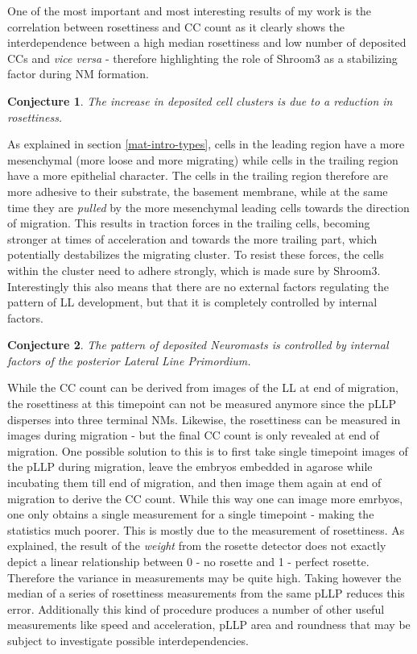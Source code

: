 \documentclass[11pt,singlespacinge,twoside]{reedthesis} %
\newtheorem{conjecture}{Conjecture}[chapter]
\theoremstyle{definition}
\theoremstyle{definition}
\theoremstyle{definition}
\theoremstyle{remark}
\begin{document}
One of the most important and most interesting results of my work is the correlation between rosettiness and CC count as it clearly shows the interdependence between a high median rosettiness and low number of deposited CCs and \emph{vice versa} - therefore highlighting the role of Shroom3 as a stabilizing factor during NM formation.
\begin{conjecture}
\protect\hypertarget{cnj:unnamed-chunk-13}{}{\label{cnj:unnamed-chunk-13} }The increase in deposited cell clusters is due to a reduction in rosettiness.
\end{conjecture}
As explained in section \ref{mat-intro-types}, cells in the leading region have a more mesenchymal (more loose and more migrating) while cells in the trailing region have a more epithelial character. The cells in the trailing region therefore are more adhesive to their substrate, the basement membrane, while at the same time they are \emph{pulled} by the more mesenchymal leading cells towards the direction of migration. This results in traction forces in the trailing cells, becoming stronger at times of acceleration and towards the more trailing part, which potentially destabilizes the migrating cluster. To resist these forces, the cells within the cluster need to adhere strongly, which is made sure by Shroom3. Interestingly this also means that there are no external factors regulating the pattern of LL development, but that it is completely controlled by internal factors.
\begin{conjecture}
\protect\hypertarget{cnj:unnamed-chunk-14}{}{\label{cnj:unnamed-chunk-14} }The pattern of deposited Neuromasts is controlled by internal factors of the posterior Lateral Line Primordium.
\end{conjecture}
While the CC count can be derived from images of the LL at end of migration, the rosettiness at this timepoint can not be measured anymore since the pLLP disperses into three terminal NMs. Likewise, the rosettiness can be measured in images during migration - but the final CC count is only revealed at end of migration. One possible solution to this is to first take single timepoint images of the pLLP during migration, leave the embryos embedded in agarose while incubating them till end of migration, and then image them again at end of migration to derive the CC count. While this way one can image more emrbyos, one only obtains a single measurement for a single timepoint - making the statistics much poorer. This is mostly due to the measurement of rosettiness. As explained, the result of the \emph{weight} from the rosette detector does not exactly depict a linear relationship between 0 - no rosette and 1 - perfect rosette. Therefore the variance in measurements may be quite high. Taking however the median of a series of rosettiness measurements from the same pLLP reduces this error. Additionally this kind of procedure produces a number of other useful measurements like speed and acceleration, pLLP area and roundness that may be subject to investigate possible interdependencies.
\end{document}
